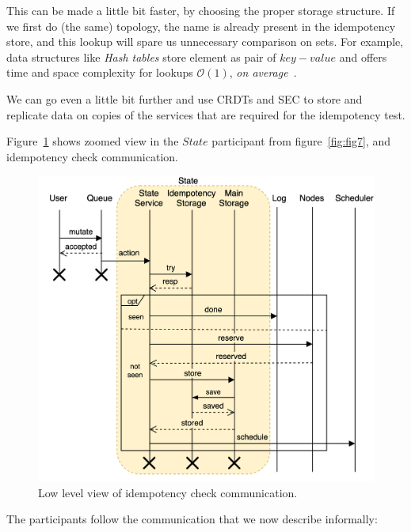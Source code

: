 This can be made a little bit faster, by choosing the proper storage structure. If we first do (the same) topology, the name is already present in the idempotency store, and this lookup will spare us unnecessary comparison on sets. For example, data structures like \emph{Hash tables} store element as pair of $key-value$ and offers time and space complexity for lookups $\mathcal{O}(1)$, \textit{on average}~\cite{0023376}. 

We can go even a little bit further and use CRDTs and SEC to store and replicate data on copies of the services that are required for the idempotency test.

Figure~\ref{fig:fig13} shows zoomed view in the $State$ participant from figure~\ref{fig:fig7}, and idempotency check communication.

\begin{figure}[H]
	\begin{center}
		\includegraphics[scale=0.7]{images/Figure13}
	\end{center}
	\vspace{-0.7cm}
	\caption{Low level view of idempotency check communication.}
	\label{fig:fig13}
\end{figure}

\noindent
The participants follow the communication that we now describe informally: \label{informal_description_idempotency}

